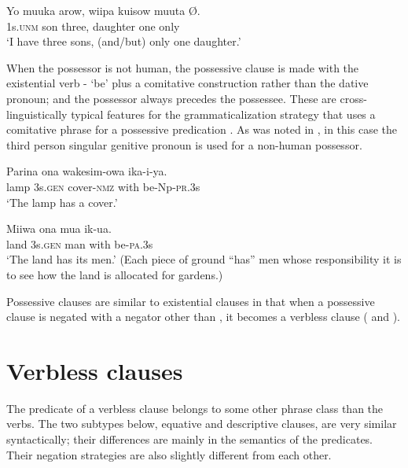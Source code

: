\ea%
\label{ex:5:x1322}
\gll Yo  muuka  arow,  wiipa  kuisow  muuta  {\O}. \\
     1s.\textsc{unm}  son  three,  daughter  one  only \\
\glt `I have three sons, (and/but) only one daughter.'
\z

When the possessor is not human, the possessive clause is made with the existential verb - `be' plus a comitative construction rather than the dative pronoun; and the possessor always precedes the possessee. These are cross-linguistically typical features for the grammaticalization strategy that uses a comitative phrase for a possessive predication \citep[53--57]{Heine1997}. As was noted in , in this case the third person singular genitive pronoun  is used for a non-human possessor.

\ea%
\label{ex:5:x1807}
\gll Parina  ona  wakesim-owa    ika-i-ya. \\
     lamp  3s.\textsc{gen}  cover-\textsc{nmz}  with  be-Np-\textsc{pr}.3s \\
\glt `The lamp has a cover.'
\z

\ea%
\label{ex:5:x1810}
\gll Miiwa  ona  mua    ik-ua. \\
     land  3s.\textsc{gen}  man  with  be-\textsc{pa}.3s \\
\glt `The land has its men.' (Each piece of ground ``has'' men whose responsibility it is to see how the land is allocated for gardens.)
\z

Possessive clauses are similar to existential clauses in that when a possessive clause is negated with a negator other than , it becomes a verbless clause ( and ).

\section{Verbless clauses}

The predicate of a verbless clause belongs to some other phrase class than the verbs. The two subtypes below, equative and descriptive clauses, are very similar syntactically; their differences are mainly in the semantics of the predicates. Their negation strategies are also slightly different from each other. 

